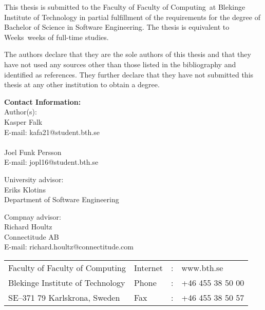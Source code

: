 \documentclass[a4paper,twoside]{bth}
\makeatletter
\newcommand{\thesisDegree}{Bachelor of Science in Software Engineering}
\newcommand{\faculty}{Faculty of Computing}
\newcommand{\thesisWeeks}{Weeks}
\newcommand{\authorFirst}{Kasper Falk}
\newcommand{\authorFirstMail}{kafa21@student.bth.se}
\newcommand{\authorSecond}{Joel Funk Persson}
\newcommand{\authorSecondMail}{jopl16@student.bth.se}
\newcommand{\super}{Eriks Klotins}
\newcommand{\superAffiliation}{Software Engineering}
\newcommand{\superCompany}{Richard Houltz}
\newcommand{\superCompanyAffiliation}{Connectitude AB}
\newcommand{\superCompanyMail}{richard.houltz@connectitude.com}
\makeatother
\begin{document}
{\pagestyle{empty}
\changepage{3cm}{1cm}{-0.5cm}{-0.5cm}{}{-1.5cm}{}{}{}

{\small
\noindent
This thesis is submitted to the Faculty of \faculty\ at Blekinge Institute
of Technology in partial fulfillment of the requirements for the degree of
\thesisDegree. The thesis is equivalent to \thesisWeeks\ weeks of full-time studies.

\vspace{1cm}

\noindent
The authors declare that they are the sole authors of this thesis and that they have
not used any sources other than those listed in the bibliography and identified as references.
They further declare that they have not submitted this thesis at any other institution to
obtain a degree.
}

\vspace{10cm}

\noindent
\textbf{Contact Information:} \\
Author(s): \\
\authorFirst \\
E-mail: \authorFirstMail \\
\\
\authorSecond \\
E-mail: \authorSecondMail

\vspace{2cm}

\noindent
University advisor: \\
\super \\
Department of \superAffiliation

\vspace{1cm}

\noindent
Compnay advisor: \\
\superCompany \\
\superCompanyAffiliation \\
E-mail: \superCompanyMail

\vspace*{\fill}

\noindent
\begin{tabular}{@{}p{} l c l}
Faculty of \faculty              & Internet & : & www.bth.se \\
Blekinge Institute of Technology & Phone    & : & +46 455 38 50 00 \\
SE--371 79 Karlskrona, Sweden    & Fax      & : & +46 455 38 50 57 \\
\end{tabular}
\clearpage
} %
\end{document}
